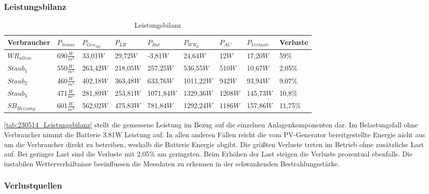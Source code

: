 \subsubsection{Leistungsbilanz}
\begin{table}[!ht]
\centering
\caption{Leistungsbilanz}
\renewcommand{\arraystretch}{1.5}
\begin{tabularx}{\linewidth}{|X|X|X|X|X|X|X|X|X|}
\hline
\rowcolor[HTML]{76B900} 
Verbraucher &$P_{Sonne}$ & $P_{Gen_{DC}}$ & $P_{LR}$ & $P_{Bat}$ & $P_{WR_E}$ & $P_{AC}$ & $P_{Verluste}$ & Verluste \\ \hline
\cellcolor[HTML]{CFE5A8}${WR}_{allein}$ & 690$\frac{W}{m^2}$     &33,01$W$ & 29,72$W$ & -3,81$W$ & 24,64$W$ & 12$W$ & 17,20$W$ & 59\% \\ \hline
\cellcolor[HTML]{CFE5A8}$Staub_{1}$     & 550$\frac{W}{m^2}$ & 263,42$W$ & 218,05$W$ &  257,25$W$ & 536,55$W$ & 510$W$ & 10,67$W$                  & 2,05\%    \\ \hline
\cellcolor[HTML]{CFE5A8}$Staub_{2}$     & 460$\frac{W}{m^2}$ & 402,18$W$ & 363,48$W$ &  633,76$W$ & 1011,22$W$ & 942$W$ & 93,94$W$                  & 9,07\%    \\ \hline
\cellcolor[HTML]{CFE5A8}$Staub_{3}$     &471$\frac{W}{m^2}$  & 281,89$W$ & 253,81$W$ & 1071,84$W$ & 1329,36$W$ & 1208$W$ & 145,73$W$                 & 10,8\%    \\ \hline
\cellcolor[HTML]{CFE5A8}$SB_{Heizung}$  &601$\frac{W}{m^2}$  & 562,02$W$ & 475,83$W$ &  781,84$W$ & 1292,24$W$ & 1186$W$ & 157,86$W$                  & 11,75\%    \\ \hline
\end{tabularx}
\label{tab:230514_Leistungsbilanz}
\end{table}

\autoref{tab:230514_Leistungsbilanz} stellt die gemessene Leistung im Bezug auf die einzelnen Anlagenkomponenten dar.
Im Belastungsfall ohne Verbraucher nimmt die Batterie 3,81W Leistung auf. In allen anderen Fällen reicht die vom PV-Generator bereitgestellte Energie nicht aus um die Verbraucher direkt zu betreiben, weshalb die Batterie Energie abgibt. Die größten Verluste treten im Betrieb ohne zusätzliche Last auf. Bei geringer Last sind die Verluste mit 2,05\% am geringsten. Beim Erhöhen der Last steigen die Verluste prozentual ebenfalls. 
Die instabilen Wetterverhältnisse beeinflussen die Messdaten zu erkennen in der schwankenden Bestrahlungsstärke.



\subsubsection{Verlustquellen}

